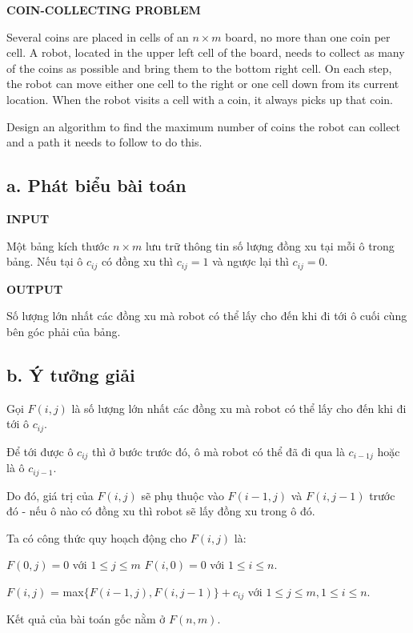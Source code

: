 \documentclass[12pt, a4paper, fleqn]{article}
\begin{document}
	
	\textbf{COIN-COLLECTING PROBLEM}
		
	Several coins are placed in cells of an $n \times m$ board, no more than one coin per cell. A robot, located in the upper left cell of the board, needs to collect as many of the coins as possible and bring them to	the bottom right cell. On each step, the robot can move either one cell to the right or one cell down from its current location. When the robot visits a cell with a coin, it always picks up that coin.
	
	Design an algorithm to find the maximum number of coins the robot can collect and a path it needs to follow to do this.
	
	\subsection*{a. Phát biểu bài toán}
	
	\textbf{INPUT}
	
	Một bảng kích thước $n \times m$ lưu trữ thông tin số lượng đồng xu tại mỗi ô trong bảng. Nếu tại ô $c_{ij}$ có đồng xu thì $c_{ij} = 1$ và ngược lại thì $c_{ij} = 0$.
	
	\textbf{OUTPUT}
	
	Số lượng lớn nhất các đồng xu mà robot có thể lấy cho đến khi đi tới ô cuối cùng bên góc phải của bảng.
	
	\subsection*{b. Ý tưởng giải}
	
	Gọi $F(i, j)$ là số lượng lớn nhất các đồng xu mà robot có thể lấy cho đến khi đi tới ô $c_{ij}$.
	
	Để tới được ô $c_{ij}$ thì ở bước trước đó, ô mà robot có thể đã đi qua là $c_{i - 1 j}$ hoặc là ô $c_{i j - 1}$.
	
	Do đó, giá trị của $F(i, j)$ sẽ phụ thuộc vào $F(i - 1, j)$ và $F(i, j - 1)$ trước đó - nếu ô nào có đồng xu thì robot sẽ lấy đồng xu trong ô đó.
	
	Ta có công thức quy hoạch động cho $F(i, j)$ là:
	
	$F(0, j) = 0$ với $1 \leq j \leq m$ \qquad \qquad \qquad \qquad $F(i, 0) = 0$ với $1 \leq i \leq n$.
	
	$F(i, j)$ = max$\{F(i - 1, j), F(i, j - 1)\} + c_{ij}$ với $1 \leq j \leq m, 1 \leq i \leq n$.
	
	Kết quả của bài toán gốc nằm ở $F(n, m)$.
	
\end{document}
